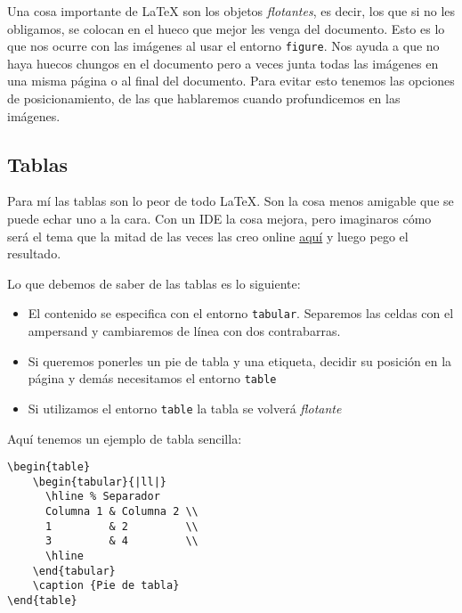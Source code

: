 Una cosa importante de LaTeX son los objetos \emph{flotantes}, es decir,
los que si no les obligamos, se colocan en el hueco que mejor les venga
del documento. Esto es lo que nos ocurre con las imágenes al usar el
entorno \lstinline!figure!. Nos ayuda a que no haya huecos chungos en el
documento pero a veces junta todas las imágenes en una misma página o al
final del documento. Para evitar esto tenemos las opciones de
posicionamiento, de las que hablaremos cuando profundicemos en las
imágenes.

\subsection{Tablas}\label{tablas}

Para mí las tablas son lo peor de todo LaTeX. Son la cosa menos amigable
que se puede echar uno a la cara. Con un IDE la cosa mejora, pero
imaginaros cómo será el tema que la mitad de las veces las creo online
\href{http://www.tablesgenerator.com/}{aquí} y luego pego el resultado.

Lo que debemos de saber de las tablas es lo siguiente:

\begin{itemize}
\item
  El contenido se especifica con el entorno \lstinline!tabular!.
  Separemos las celdas con el ampersand y cambiaremos de línea con dos
  contrabarras.
\item
  Si queremos ponerles un pie de tabla y una etiqueta, decidir su
  posición en la página y demás necesitamos el entorno \lstinline!table!
\item
  Si utilizamos el entorno \lstinline!table! la tabla se volverá
  \emph{flotante}
\end{itemize}

Aquí tenemos un ejemplo de tabla sencilla:

\begin{lstlisting}[language={[latex]tex}]
\begin{table}
    \begin{tabular}{|ll|}
      \hline % Separador
      Columna 1 & Columna 2 \\
      1         & 2         \\
      3         & 4         \\
      \hline
    \end{tabular}
    \caption {Pie de tabla}
\end{table}
\end{lstlisting}

